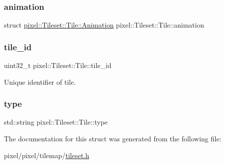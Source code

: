 \subsubsection{\texorpdfstring{animation}{animation}}
{\footnotesize\ttfamily struct \hyperlink{structpixel_1_1_tileset_1_1_tile_1_1_animation}{pixel\+::\+Tileset\+::\+Tile\+::\+Animation}  pixel\+::\+Tileset\+::\+Tile\+::animation}

\mbox{\label{structpixel_1_1_tileset_1_1_tile_aea8eb01c2f67c1cac8cbf12bbbf3d741}} 
\subsubsection{\texorpdfstring{tile\+\_\+id}{tile\_id}}
{\footnotesize\ttfamily uint32\+\_\+t pixel\+::\+Tileset\+::\+Tile\+::tile\+\_\+id}



Unique identifier of tile. 

\mbox{\label{structpixel_1_1_tileset_1_1_tile_aea4a964f0eb344459f06a7e9c5552f95}} 
\subsubsection{\texorpdfstring{type}{type}}
{\footnotesize\ttfamily std\+::string pixel\+::\+Tileset\+::\+Tile\+::type}



The documentation for this struct was generated from the following file\+:\begin{DoxyCompactItemize}
\item 
pixel/pixel/tilemap/\hyperlink{tileset_8h}{tileset.\+h}\end{DoxyCompactItemize}
